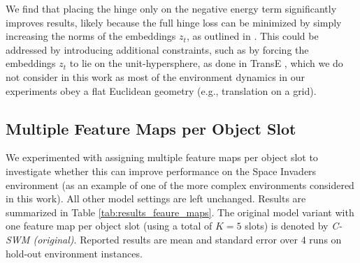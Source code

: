 \documentclass{article} %
\begin{document}
We find that placing the hinge only on the negative energy term significantly improves results, likely because the full hinge loss can be minimized by simply increasing the norms of the embeddings $z_t$, as outlined in \citet{bordes2013translating}. This could be addressed by introducing additional constraints, such as by forcing the embeddings $z_t$ to lie on the unit-hypersphere, as done in TransE \citep{bordes2013translating}, which we do not consider in this work as most of the environment dynamics in our experiments obey a flat Euclidean geometry (e.g., translation on a grid).


\subsection{Multiple Feature Maps per Object Slot}
\label{sec:feature-maps}
We experimented with assigning multiple feature maps per object slot to investigate whether this can improve performance on the Space Invaders environment (as an example of one of the more complex environments considered in this work). All other model settings are left unchanged. Results are summarized in Table \ref{tab:results_feaure_maps}. The original model variant with one feature map per object slot (using a total of $K=5$ slots) is denoted by \textit{C-SWM (original)}. Reported results are mean and standard error over 4 runs on hold-out environment instances.
\end{document}
